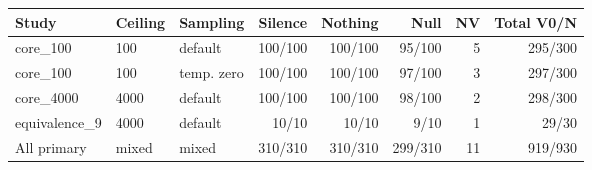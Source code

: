 \begin{tabular}{lllrrrrr}
\toprule
Study & Ceiling & Sampling & Silence & Nothing & Null & NV & Total V0/N \\
\midrule
core\_100 & 100 & default & 100/100 & 100/100 & 95/100 & 5 & 295/300 \\
core\_100 & 100 & temp. zero & 100/100 & 100/100 & 97/100 & 3 & 297/300 \\
core\_4000 & 4000 & default & 100/100 & 100/100 & 98/100 & 2 & 298/300 \\
equivalence\_9 & 4000 & default & 10/10 & 10/10 & 9/10 & 1 & 29/30 \\
All primary & mixed & mixed & 310/310 & 310/310 & 299/310 & 11 & 919/930 \\
\bottomrule
\end{tabular}
